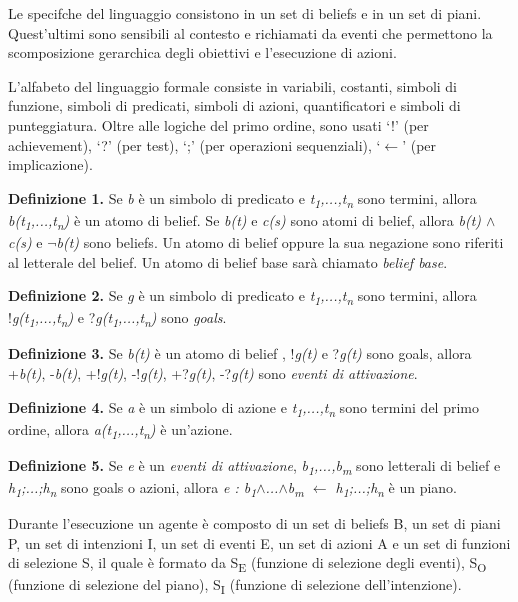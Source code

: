 \medskip
Le specifche del linguaggio consistono in un set di beliefs e in un set di piani. Quest'ultimi sono sensibili al contesto e richiamati da eventi che permettono la scomposizione gerarchica degli obiettivi e l'esecuzione di azioni.

L'alfabeto del linguaggio formale consiste in variabili, costanti, simboli di funzione, simboli di predicati, simboli di azioni, quantificatori e simboli di punteggiatura. Oltre alle logiche del primo ordine, sono usati `!' (per achievement), `?' (per test), `;' (per operazioni sequenziali), `$\leftarrow$' (per implicazione).

\smallskip
\textbf{Definizione 1.} Se \textit{b} \`e un simbolo di predicato e \textit{t\textsubscript{1},...,t\textsubscript{n}} sono termini, allora \textit{b(t\textsubscript{1},...,t\textsubscript{n})} \`e un atomo di belief. Se \textit{b(t)} e \textit{c(s)} sono atomi di belief, allora \textit{b(t) $\land$ c(s)} e \textit{$\neg$b(t)} sono beliefs. Un atomo di belief oppure la sua negazione sono riferiti al letterale del belief. Un atomo di belief base sar\`a chiamato \textit{belief base}.

\smallskip
\textbf{Definizione 2.} Se \textit{g} \`e un simbolo di predicato e \textit{t\textsubscript{1},...,t\textsubscript{n}} sono termini, allora !\textit{g(t\textsubscript{1},...,t\textsubscript{n})} e ?\textit{g(t\textsubscript{1},...,t\textsubscript{n})} sono \textit{goals}.

\smallskip
\textbf{Definizione 3.} Se \textit{b(t)} \`e un atomo di belief , !\textit{g(t)} e ?\textit{g(t)} sono goals, allora +\textit{b(t)}, -\textit{b(t)}, +!\textit{g(t)}, -!\textit{g(t)}, +?\textit{g(t)}, -?\textit{g(t)} sono \textit{eventi di attivazione}.

\smallskip
\textbf{Definizione 4.} Se \textit{a} \`e un simbolo di azione e \textit{t\textsubscript{1},...,t\textsubscript{n}} sono termini del primo ordine, allora \textit{a(t\textsubscript{1},...,t\textsubscript{n})} \`e un'azione.

\smallskip
\textbf{Definizione 5.} Se \textit{e} \`e un \textit{eventi di attivazione}, \textit{b\textsubscript{1},...,b\textsubscript{m}} sono letterali di belief e \textit{h\textsubscript{1};...;h\textsubscript{n}} sono goals o azioni, allora \textit{e : b\textsubscript{1}$\land$...$\land$b\textsubscript{m} $\leftarrow$ h\textsubscript{1};...;h\textsubscript{n}} \`e un piano.

\bigskip
Durante l'esecuzione un agente \`e composto di un set di beliefs B, un set di piani P, un set di intenzioni I, un set di eventi E, un set di azioni A e un set di funzioni di selezione S, il quale \`e formato da S\textsubscript{E} (funzione di selezione degli eventi), S\textsubscript{O} (funzione di selezione del piano), S\textsubscript{I} (funzione di selezione dell'intenzione).

